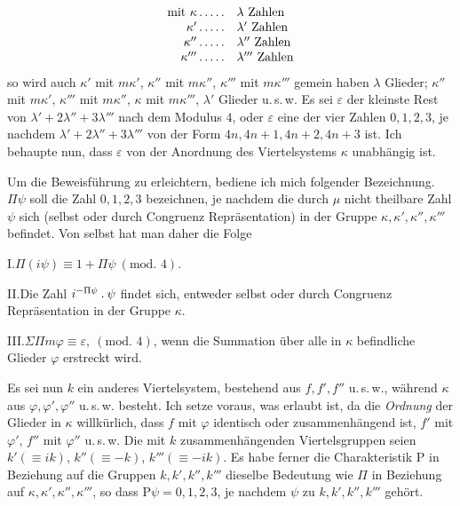\[
\begin{array}{rl}
\text{mit }\kappa\mathinner{.\,.\,.\,.\,.}&\lambda\text{ Zahlen}\\
\kappa'\mathinner{.\,.\,.\,.\,.}&\lambda'\text{ Zahlen}\\
\kappa''\mathinner{.\,.\,.\,.\,.}&\lambda''\text{ Zahlen}\\
\kappa'''\mathinner{.\,.\,.\,.\,.}&\lambda'''\text{ Zahlen}
\end{array}
\]
so wird auch $\kappa'$ mit $m\kappa'$, $\kappa''$ mit $m\kappa''$, $\kappa'''$ mit $m\kappa'''$ gemein haben $\lambda$ Glieder; %
%
$\kappa''$ mit $m\kappa'$, $\kappa'''$ mit $m\kappa''$, $\kappa$ mit $m\kappa'''$, $\lambda'$ Glieder u.\,s.\,w. Es sei $\varepsilon$ der kleinste Rest von $\lambda'+2\lambda''+3\lambda'''$ nach dem Modulus $4$, oder $\varepsilon$ eine der vier Zahlen $0,1,2,3$, je nachdem $\lambda'+2\lambda''+3\lambda'''$ von der Form $4n,4n+1,4n+2,4n+3$ ist. Ich behaupte nun, dass $\varepsilon$ von der Anordnung des Viertelsystems $\kappa$ unabhängig ist.

Um die Beweisführung zu erleichtern, bediene ich mich folgender Bezeichnung. $\Pi\psi$ soll die Zahl $0,1,2,3$ bezeichnen, je nachdem die durch $\mu$ nicht theilbare Zahl $\psi$ sich (selbst oder durch Congruenz Repräsentation) in der Gruppe $\kappa,\kappa',\kappa'',\kappa'''$ befindet. Von selbst hat man daher die Folge

I.\quad $\Pi(i\psi)\equiv1+\Pi\psi\ (\text{mod. }4)$.

II.\quad Die Zahl $i^{-\Pi\psi}\mathbin{.}\psi$ findet sich, entweder selbst oder durch Congruenz Repräsentation in der Gruppe $\kappa$.

III.\quad $\Sigma\Pi m\varphi\equiv\varepsilon,\ (\text{mod. }4)$, wenn die Summation über alle in $\kappa$ befindliche Glieder $\varphi$ erstreckt wird.

Es sei nun $k$ ein anderes Viertelsystem, bestehend aus $f,f',f''$ u.\,s.\,w., während $\kappa$ aus $\varphi,\varphi',\varphi''$ u.\,s.\,w. besteht. Ich setze voraus, was erlaubt ist, da die \emph{Ordnung} der Glieder in $\kappa$ willkürlich, dass $f$ mit $\varphi$ identisch oder zusammenhängend ist, $f'$ mit $\varphi'$, $f''$ mit $\varphi''$ u.\,s.\,w. Die mit $k$ zusammenhängenden Viertelsgruppen seien $k'(\equiv ik)$, $k''(\equiv-k)$, $k'''(\equiv-ik)$. Es habe ferner die Charakteristik $\mathrm{P}$ in Beziehung auf die Gruppen $k,k',k'',k'''$ dieselbe Bedeutung wie $\Pi$ in Beziehung auf $\kappa,\kappa',\kappa'',\kappa'''$, so dass $\mathrm{P}\psi=0,1,2,3$, je nachdem $\psi$ zu $k,k',k'',k'''$ gehört.

